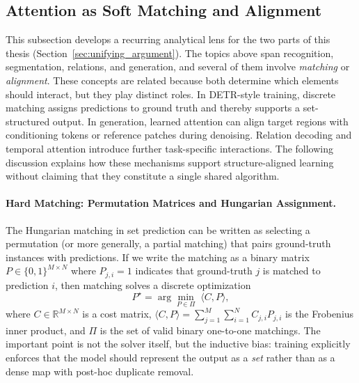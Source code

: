 \subsection{Attention as Soft Matching and Alignment}
\label{sec:attention_soft_matching}
This subsection develops a recurring analytical lens for the two parts of this thesis (Section~\ref{sec:unifying_argument}). The topics above span recognition, segmentation, relations, and generation, and several of them involve \emph{matching} or \emph{alignment}. These concepts are related because both determine which elements should interact, but they play distinct roles. In DETR-style training, discrete matching assigns predictions to ground truth and thereby supports a set-structured output. In generation, learned attention can align target regions with conditioning tokens or reference patches during denoising. Relation decoding and temporal attention introduce further task-specific interactions. The following discussion explains how these mechanisms support structure-aligned learning without claiming that they constitute a single shared algorithm.

\paragraph{Hard Matching: Permutation Matrices and Hungarian Assignment.}
The Hungarian matching in set prediction can be written as selecting a permutation (or more generally, a partial matching) that pairs ground-truth instances with predictions. If we write the matching as a binary matrix $P\in\{0,1\}^{M\times N}$ where $P_{j,i}=1$ indicates that ground-truth $j$ is matched to prediction $i$, then matching solves a discrete optimization
\begin{equation}
P^\star = \arg\min_{P \in \Pi}\;\langle C, P\rangle,
\end{equation}
where $C\in\mathbb{R}^{M\times N}$ is a cost matrix, $\langle C, P\rangle=\sum_{j=1}^{M}\sum_{i=1}^{N} C_{j,i}P_{j,i}$ is the Frobenius inner product, and $\Pi$ is the set of valid binary one-to-one matchings. The important point is not the solver itself, but the inductive bias: training explicitly enforces that the model should represent the output as a \emph{set} rather than as a dense map with post-hoc duplicate removal.

